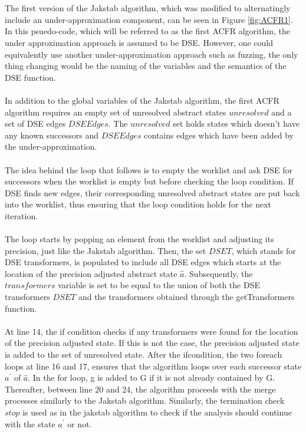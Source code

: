 \documentclass{kththesis}
\begin{document}
\\ \\
The first version of the Jakstab algorithm, which was modified to alternatingly include an under-approximation component, can be seen in Figure \ref{fig:ACFR1}. In this psuedo-code, which will be referred to as the first ACFR algorithm, the under approximation approach is assumed to be DSE. However, one could equivalently use another under-approximation approach such as fuzzing, the only thing changing would be the naming of the variables and the semantics of the DSE function.
\\ \\
In addition to the global variables of the Jakstab algorithm, the first ACFR algorithm requires an empty set of unresolved abstract states $unresolved$ and a set of DSE edges $DSEEdges$. The $unresolved$ set holds states which doesn't have any known successors and $DSEEdges$ contains edges which have been added by the under-approximation. 
\\ \\
The idea behind the loop that follows is to empty the worklist and ask DSE for successors when the worklist is empty but before checking the loop condition. If DSE finds new edges, their corresponding unresolved abstract states are put back into the worklist, thus ensuring that the loop condition holds for the next iteration.
\\ \\
The loop starts by popping an element from the worklist and adjusting its precision, just like the Jakstab algorithm. Then, the set $DSET$, which stands for DSE transformers, is populated to include all DSE edges which starts at the location of the precision adjusted abstract state $\hat{a}$. Subsequently, the $transformers$ variable is set to be equal to the union of both the DSE transformers $DSET$ and the transformers obtained through the getTransformers function.
\\ \\
At line 14, the if condition checks if any transformers were found for the location of the precision adjusted state. If this is not the case, the precision adjusted state is added to the set of unresolved state. After the ifcondition, the two foreach loops at line 16 and 17, ensures that the algorithm loops over each successor state $a^{'}$ of $\hat{a}$. In the for loop, g is added to G if it is not already contained by G. Thereafter, between line 20 and 24, the algorithm proceeds with the merge processes similarly to the Jakstab algorithm. Similarly, the termination check $stop$ is used as in the jakstab algorithm to check if the analysis should continue with the state $a^{'}$ or not.
\end{document}
